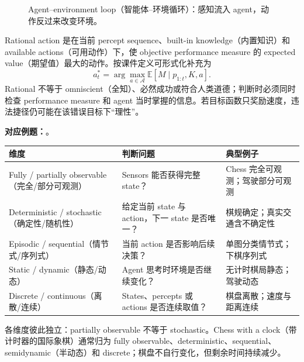 \begin{figure}[htbp]
  \centering
  \resizebox{0.82\textwidth}{!}{}
  \caption{Agent--environment loop（智能体--环境循环）：感知流入 agent，动作反过来改变环境。}
  \label{fig:sc3000-l01-agent-loop}
\end{figure}

Rational action 是在当前 percept sequence、built-in knowledge（内置知识）和 available actions（可用动作）下，使 objective performance measure 的 expected value（期望值）最大的动作。按课件定义可形式化补充为
\[
  \boxed{a_t^*=\arg\max_{a\in\mathcal A}
  \mathbb E\!\left[M\mid p_{1:t},K,a\right]}.
\]
Rational 不等于 omniscient（全知）、必然成功或符合人类道德；判断时必须同时检查 performance measure 和 agent 当时掌握的信息。若目标函数只奖励速度，违法捷径仍可能在该错误目标下“理性”。

\textbf{对应例题：}。


\begin{center}
\small
\begin{tabularx}{\textwidth}{@{}>{\raggedright\arraybackslash}p{3.5cm}X>{\raggedright\arraybackslash}p{4.0cm}@{}}
  \toprule
  维度 & 判断问题 & 典型例子 \\
  \midrule
  Fully / partially observable（完全/部分可观测） & Sensors 能否获得完整 state？ & Chess 完全可观测；驾驶部分可观测 \\
  Deterministic / stochastic（确定性/随机性） & 给定当前 state 与 action，下一 state 是否唯一？ & 棋规确定；真实交通含不确定性 \\
  Episodic / sequential（情节式/序列式） & 当前 action 是否影响后续决策？ & 单图分类情节式；下棋序列式 \\
  Static / dynamic（静态/动态） & Agent 思考时环境是否继续变化？ & 无计时棋局静态；驾驶动态 \\
  Discrete / continuous（离散/连续） & States、percepts 或 actions 是否连续取值？ & 棋盘离散；速度与距离连续 \\
  \bottomrule
\end{tabularx}
\end{center}

各维度彼此独立：partially observable 不等于 stochastic。Chess with a clock（带计时器的国际象棋）通常归为 fully observable、deterministic、sequential、semidynamic（半动态）和 discrete；棋盘不自行变化，但剩余时间持续减少。

